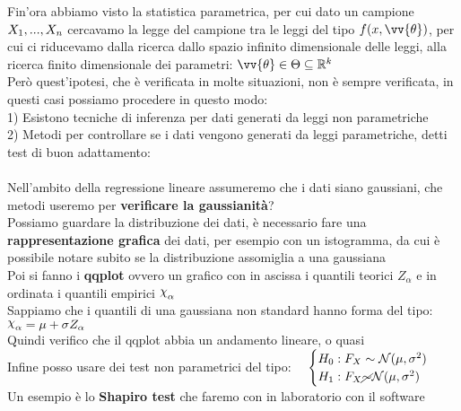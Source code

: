 
Fin'ora abbiamo visto la statistica parametrica, per cui dato un campione $X_1,...,X_n$ cercavamo la legge del campione tra le leggi del tipo $ f(x,\vv{\theta})$, per cui ci riducevamo dalla ricerca dallo spazio infinito dimensionale delle leggi, alla ricerca finito dimensionale dei parametri: $\vv{\theta}\in \Theta\subseteq \R^k$\\

Però quest'ipotesi, che è verificata in molte situazioni, non è sempre verificata, in questi casi possiamo procedere in questo modo:\\

1) Esistono tecniche di inferenza per dati generati da leggi non parametriche\\

2) Metodi per controllare se i dati vengono generati da leggi parametriche, detti test di buon adattamento:\\ \\

Nell'ambito della regressione lineare assumeremo che i dati siano gaussiani, che metodi useremo per \textbf{verificare la gaussianità}?\\


Possiamo guardare la distribuzione dei dati, è necessario fare una \textbf{rappresentazione grafica} dei dati, per esempio con un istogramma, da cui è possibile notare subito se la distribuzione assomiglia a una gaussiana\\

Poi si fanno i \textbf{qqplot} ovvero un grafico con in ascissa i quantili teorici $Z_{\alpha}$ e in ordinata i quantili empirici $\Chi_{\alpha}$\\

Sappiamo che i quantili di una gaussiana non standard hanno forma  del tipo: \ $\Chi_{\alpha}=\mu+\sigma Z_{\alpha}$\\
Quindi verifico che il qqplot abbia un andamento lineare, o quasi\\


Infine posso usare dei  test non parametrici del tipo: \ \ $\begin{cases}
H_0 : F_X \sim \mathcal N(\mu,\sigma^2)\\
H_1 : F_X \cancel{\sim} \mathcal N (\mu, \sigma^2)
\end{cases}$\\
Un esempio è lo \textbf{Shapiro test} che faremo con in laboratorio con il software\\ \\




